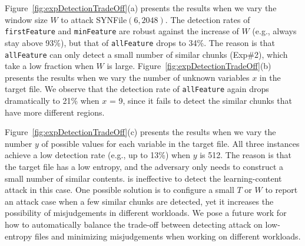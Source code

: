 Figure~\ref{fig:expDetectionTradeOff}(a) presents the results when we vary the window size $W$ to attack SYNFile$(6, 2048)$. The detection rates of {\tt firstFeature} and {\tt minFeature} are robust against the increase of $W$ (e.g., always stay above 93\%), but that of {\tt allFeature} drops to 34\%. The reason is that {\tt allFeature} can only detect a small number of similar chunks (Exp\#2), which take a low fraction when $W$ is large. Figure~\ref{fig:expDetectionTradeOff}(b) presents the results when we vary the number of unknown variables $x$ in the target file. We observe that the detection rate of {\tt allFeature} again drops dramatically to 21\% when $x$ = 9, since it fails to detect the similar chunks that have more different regions.


Figure~\ref{fig:expDetectionTradeOff}(c) presents the results when we vary the number $y$ of possible values for each variable in the target file. All three instances achieve a low detection rate (e.g., up to 13\%) when $y$ is 512. The reason is that the target file has a low entropy, and the adversary only needs to construct a small number of similar contents.  \sysnameF is ineffective to detect the learning-content attack in this case.
One possible solution is to configure a small $T$ or $W$ to report an attack case when a few similar chunks are detected, yet it increases the possibility of misjudgements in different workloads.
We pose a future work for how to automatically balance the trade-off between detecting attack on low-entropy files and minimizing misjudgements when working on different workloads.




